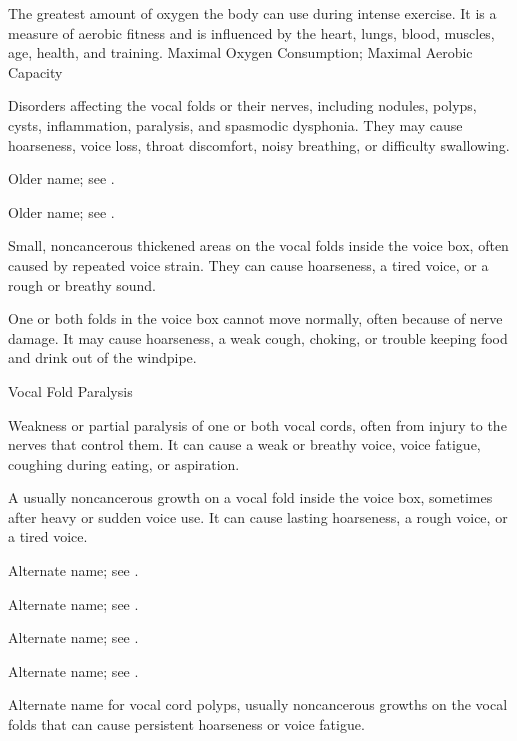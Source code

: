  The greatest amount of oxygen the body can use during intense exercise. It is a measure of aerobic fitness and is influenced by the heart, lungs, blood, muscles, age, health, and training.
\synonyms
Maximal Oxygen Consumption; Maximal Aerobic Capacity

 Disorders affecting the vocal folds or their nerves, including nodules, polyps, cysts, inflammation, paralysis, and spasmodic dysphonia. They may cause hoarseness, voice loss, throat discomfort, noisy breathing, or difficulty swallowing.

 Older name; see .

 Older name; see .

 Small, noncancerous thickened areas on the vocal folds inside the voice box, often caused by repeated voice strain. They can cause hoarseness, a tired voice, or a rough or breathy sound.

 One or both folds in the voice box cannot move normally, often because of nerve damage. It may cause hoarseness, a weak cough, choking, or trouble keeping food and drink out of the windpipe.

\synonyms
Vocal Fold Paralysis

 Weakness or partial paralysis of one or both vocal cords, often from injury to the nerves that control them. It can cause a weak or breathy voice, voice fatigue, coughing during eating, or aspiration.

 A usually noncancerous growth on a vocal fold inside the voice box, sometimes after heavy or sudden voice use. It can cause lasting hoarseness, a rough voice, or a tired voice.

 Alternate name; see .

 Alternate name; see .

 Alternate name; see .

 Alternate name; see .

 Alternate name for vocal cord polyps, usually noncancerous growths on the vocal folds that can cause persistent hoarseness or voice fatigue.

